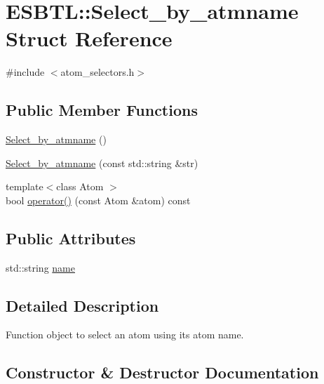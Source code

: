 \hypertarget{structESBTL_1_1Select__by__atmname}{}\section{E\+S\+B\+TL\+:\+:Select\+\_\+by\+\_\+atmname Struct Reference}
\label{structESBTL_1_1Select__by__atmname}


{\ttfamily \#include $<$atom\+\_\+selectors.\+h$>$}

\subsection*{Public Member Functions}
\begin{DoxyCompactItemize}
\item 
\hyperlink{structESBTL_1_1Select__by__atmname_afac859029af0490d35996300c473730f}{Select\+\_\+by\+\_\+atmname} ()
\item 
\hyperlink{structESBTL_1_1Select__by__atmname_a00cfd9113fc749d2981b34f26da3278d}{Select\+\_\+by\+\_\+atmname} (const std\+::string \&str)
\item 
{\footnotesize template$<$class Atom $>$ }\\bool \hyperlink{structESBTL_1_1Select__by__atmname_a2a8ba27b1e026b866279352a9bacaea6}{operator()} (const Atom \&atom) const
\end{DoxyCompactItemize}
\subsection*{Public Attributes}
\begin{DoxyCompactItemize}
\item 
std\+::string \hyperlink{structESBTL_1_1Select__by__atmname_ac038c0e310fe3213c6ced27fadc5cf8a}{name}
\end{DoxyCompactItemize}


\subsection{Detailed Description}
Function object to select an atom using its atom name. 

\subsection{Constructor \& Destructor Documentation}
\mbox{\label{structESBTL_1_1Select__by__atmname_afac859029af0490d35996300c473730f}} 

